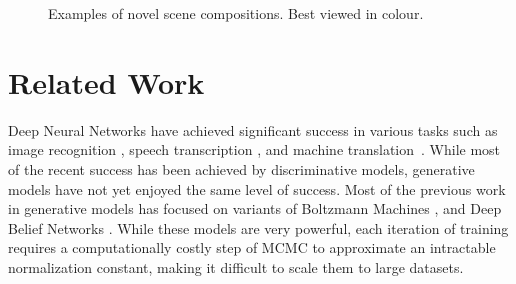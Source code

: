 \documentclass{article} %
\begin{document}
\begin{figure}[!t]
\captionsetup[subfigure]{labelformat=empty}
\vspace{-0.3in}
\begin{center}
\quad
%
\quad
%
\quad
%
\quad
%
\end{center}
\caption{\small Examples of novel scene compositions. Best viewed in colour.}
\label{fig:genimages4}
\vspace{-0.2in}
\end{figure}

\section{Related Work}
\vspace{-0.1in}
Deep Neural Networks have achieved significant success in various tasks such as image recognition \citep{krizhevsky_imagenet}, speech transcription \citep{graves_speech}, and machine 
translation~\citep{bahdanau_mt}. 
While most of the recent success has been achieved by discriminative models, generative models have not yet enjoyed the same level of success. Most of the previous work in generative models has focused on variants of Boltzmann Machines \citep{smolensky_rbm}, \citep{russ_dbm} and Deep Belief Networks \citep{hinton_dbn}. While these models are very powerful, each iteration of training requires a computationally costly step of MCMC to approximate an intractable normalization constant, making it difficult to scale them to large datasets.
\end{document}
